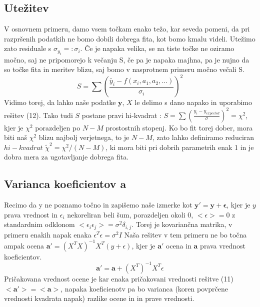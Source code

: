 \documentclass[11pt, a4paper]{article}
\renewcommand{\vec}[1]{\mathbf{#1}}
\begin{document}
\subsection{Utežitev}
V osnovnem primeru, damo vsem točkam enako težo, kar seveda pomeni, da pri razpršenih podatkih ne bomo dobili dobrega fita, kot bomo kmalu videli. Utežimo zato residuale s  $\sigma_{y_i} =: \sigma_i$. Če je napaka velika, se na tiste točke ne oziramo močno, saj ne pripomorejo k večanju S, če pa je napaka majhna, pa je nujno da so točke fita in meritev blizu, saj bomo v nasprotnem primeru močno večali S.
\begin{equation}
S = \sum (\frac{\widetilde{y_i} - f(x_i, a_1,a_2,...)}{\sigma_i})^2
\end{equation}
Vidimo torej, da lahko naše podatke $\vec{y}$, $X$ le delimo s dano napako in uporabimo rešitev (12). \newline\newline 
Tako tudi $S$ postane pravi hi-kvadrat :  $S = \sum (\frac{y_i - y_{expected}}{\sigma})^2 = \chi^2$, kjer je $\chi^2$ porazdeljen po $N-M$ prostostnih stopenj. \newline\newline
Ko bo fit torej dober, mora biti naš $\chi^2$ blizu najbolj verjetnega, to je $N-M$, zato lahko definiramo reduciran $hi-kvadrat$ $\widetilde{\chi}^2 = \chi^2 /(N-M)$, ki mora biti pri dobrih parametrih enak 1 in je dobra mera za ugotavljanje dobrega fita.
\subsection{Varianca koeficientov $\vec{a}$}
Recimo da y ne poznamo točno in zapišemo naše izmerke kot $\vec{y' } = \vec{y} + \vec{\epsilon}$, kjer je $y$ prava vrednost in $\epsilon_i$ nekoreliran beli šum, porazdeljen okoli 0, $<\epsilon> = 0 $ z standardnim odklonom $<\epsilon_i \epsilon_j> = \sigma^2 \delta_{i,j}$. Torej je kovariančna matrika, v primeru enakih napak enaka $\epsilon^T\epsilon = \sigma^2 I$
 Naša rešitev v tem primeru ne bo točna ampak ocena $\vec{a'} = (X^T X)^{-1} X^T (y + \epsilon)$, kjer je $\vec{a'}$ ocena in $\vec{a}$ prava vrednost koeficientov. 
\begin{equation}
\vec{a'} = \vec{a} + (X^T)^{-1} X^T \epsilon
\end{equation}
Pričakovana vrednost ocene je kar enaka pričakovani vrednosti rešitve (11) $<\vec{a'}> = <\vec{a}>$, napaka koeficienotv pa bo varianca (koren povprčene vrednosti kvadrata napak) razlike ocene in in prave vrednosti.
\end{document}

